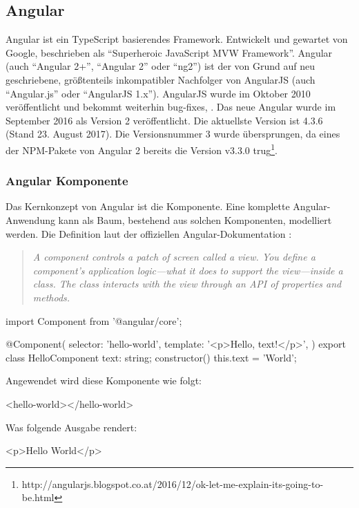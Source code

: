 \subsection{Angular}
Angular ist ein TypeScript basierendes Framework. Entwickelt und gewartet von Google, beschrieben als "`Superheroic JavaScript MVW Framework"'. Angular (auch "`Angular 2+"', "`Angular 2"' oder "`ng2"') ist der von Grund auf neu geschriebene, größtenteils inkompatibler Nachfolger von AngularJS (auch "`Angular.js"' oder "`AngularJS 1.x"').
AngularJS wurde im Oktober 2010 veröffentlicht und bekommt weiterhin bug-fixes, \etc. Das neue Angular wurde im September 2016 als Version 2 veröffentlicht. Die aktuellste Version ist 4.3.6 (Stand 23. August 2017). Die Versionsnummer 3 wurde übersprungen, da eines der NPM-Pakete von Angular 2 bereits die Version v3.3.0 trug\footnote{http://angularjs.blogspot.co.at/2016/12/ok-let-me-explain-its-going-to-be.html}.

\subsubsection{Angular Komponente}
Das Kernkonzept von Angular ist die Komponente. Eine komplette Angular-Anwendung kann als Baum, bestehend aus solchen Komponenten, modelliert werden.
Die Definition laut der offiziellen Angular-Dokumentation \cite{angular-component}: 
\begin{quote}
	\begin{english}
		\textit{A component controls a patch of screen called a view. You define a component's application logic—what it does to support the view—inside a class. The class interacts with the view through an API of properties and methods.}
	\end{english}
\end{quote}

\begin{JsCode}
	import { Component } from '@angular/core';
	
	@Component({
		selector: 'hello-world',
		template: '<p>Hello, {{text}}!</p>',
	})
	export class HelloComponent {
		text: string;
		constructor() {
			this.text = 'World';
		}
	}
\end{JsCode}
Angewendet wird diese Komponente wie folgt:
\begin{JsCode}[numbers=none]
	<hello-world></hello-world>
\end{JsCode}
Was folgende Ausgabe rendert:
\begin{JsCode}Hello World</p>
\end{JsCode}

